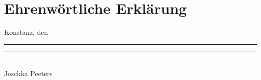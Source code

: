 \chapter*{Ehrenwörtliche Erklärung}


\vspace{3cm}

\noindent Konstanz, den \rule{3.5cm}{0.4pt} \hfill \rule{6cm}{0.4pt}\\
\phantom{Konstanz, den Datum} \hfill Joschka Peeters
